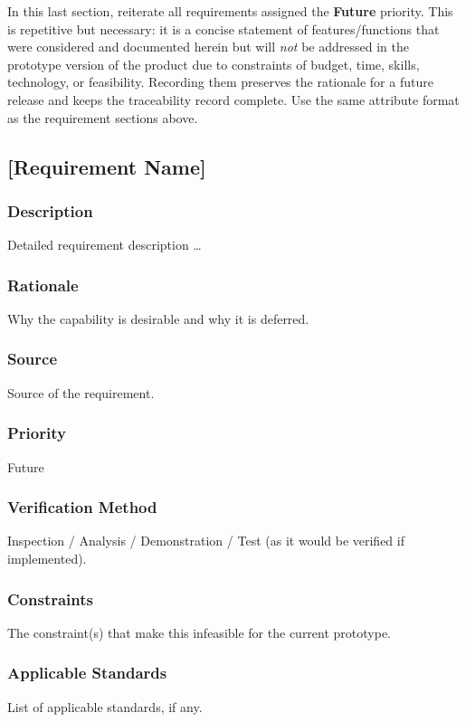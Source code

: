 In this last section, reiterate all requirements assigned the \textbf{Future} priority. This is repetitive but necessary: it is a concise statement of features/functions that were considered and documented herein but will \textit{not} be addressed in the prototype version of the product due to constraints of budget, time, skills, technology, or feasibility. Recording them preserves the rationale for a future release and keeps the traceability record complete. Use the same attribute format as the requirement sections above.

\subsection{[Requirement Name]}
\subsubsection{Description}
Detailed requirement description \ldots
\subsubsection{Rationale}
Why the capability is desirable and why it is deferred.
\subsubsection{Source}
Source of the requirement.
\subsubsection{Priority}
Future
\subsubsection{Verification Method}
Inspection / Analysis / Demonstration / Test (as it would be verified if implemented).
\subsubsection{Constraints}
The constraint(s) that make this infeasible for the current prototype.
\subsubsection{Applicable Standards}
List of applicable standards, if any.
